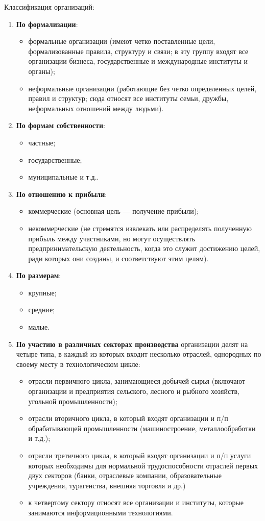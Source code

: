 \documentclass[a4paper,12pt,oneside,final]{extarticle}
\numberwithin{equation}{section}
\begin{document}
Классификация организаций:
\begin{enumerate}
	\item \textbf{По формализации}:
	\begin{itemize}
		\item формальные организации (имеют четко поставленные цели, формализованные правила, структуру и связи; в эту группу входят все организации бизнеса, государственные и международные институты и органы);
		\item неформальные организации (работающие без четко определенных целей, правил и структур; сюда относят все институты семьи, дружбы, неформальных отношений между людьми).
	\end{itemize}
	\item \textbf{По формам собственности}:
	\begin{itemize}
		\item частные;
		\item государственные;
		\item муниципальные и т.д..
	\end{itemize}
	\item \textbf{По отношению к прибыли}:
	\begin{itemize}
		\item коммерческие (основная цель --- получение прибыли);
		\item некоммерческие (не стремятся извлекать или распределять полученную прибыль между участниками, но могут осуществлять предпринимательскую деятельность, когда это служит достижению целей, ради которых они созданы, и соответствуют этим целям).
	\end{itemize}
	\item \textbf{По размерам}:
	\begin{itemize}
		\item крупные;
		\item средние;
		\item малые.
	\end{itemize}
	\item \textbf{По участию в различных секторах производства} организации делят на четыре типа, в каждый из которых входит несколько отраслей, однородных по своему месту в технологическом цикле:
	\begin{itemize}
		\item отрасли первичного цикла, занимающиеся добычей сырья (включают организации и предприятия сельского, лесного и рыбного хозяйств, угольной промышленности);
		\item отрасли вторичного цикла, в который входят организации и п/п обрабатывающей промышленности (машиностроение, металлообработки и т.д.);
		\item отрасли третичного цикла, в который входят организации и п/п услуги которых необходимы для нормальной трудоспособности отраслей первых двух секторов (банки, отраслевые компании, образовательные учреждения, турагенства, внешняя торговля и др.)
		\item к четвертому сектору относят все организации и институты, которые занимаются информационными технологиями.
	\end{itemize}
\end{enumerate}
\end{document}
